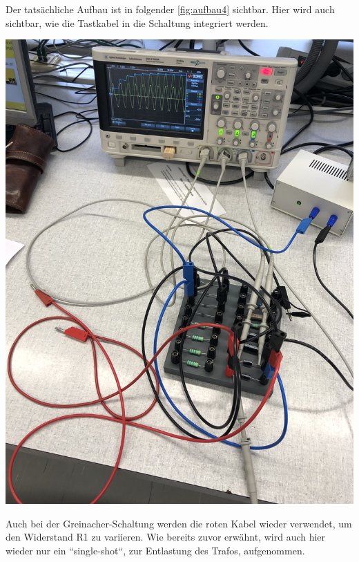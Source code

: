 \documentclass[11pt,ngerman]{scrartcl}
\begin{document}

\noindent Der tatsächliche Aufbau ist in folgender \autoref{fig:aufbau4} sichtbar. Hier wird auch sichtbar, wie die Tastkabel in die Schaltung integriert werden.

\begin{center}
	\begin{minipage}[t]{0.45\textwidth}
		\includegraphics[angle = -90,width=\textwidth]{aufbau4}
		\label{fig:aufbau4}
	\end{minipage}
\end{center}

Auch bei der Greinacher-Schaltung werden die roten Kabel wieder verwendet, um den Widerstand R1 zu variieren. Wie bereits zuvor erwähnt, wird auch hier wieder nur ein ``single-shot``, zur Entlastung des Trafos, aufgenommen.
\end{document}
